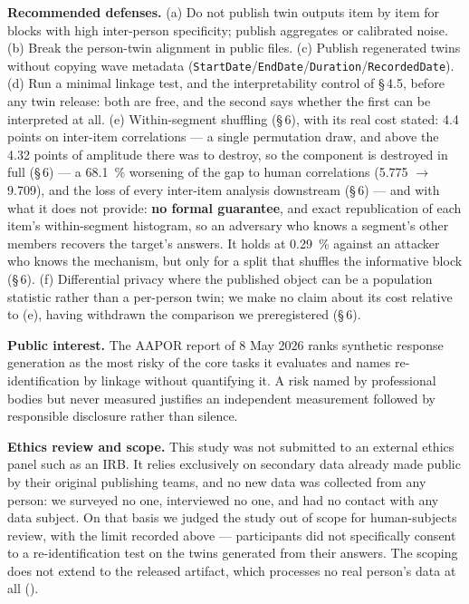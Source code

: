 \documentclass[sigconf,anonymous,review]{acmart}
\begin{document}
\begin{ethics}
\textbf{Recommended defenses.} (a) Do not publish twin outputs item by item for blocks with high inter-person specificity; publish aggregates or calibrated noise. (b) Break the person-twin alignment in public files. (c) Publish regenerated twins without copying wave metadata (\texttt{StartDate}/\texttt{EndDate}/\texttt{Duration}/\texttt{RecordedDate}). (d) Run a minimal linkage test, and the interpretability control of \S\,4.5, before any twin release: both are free, and the second says whether the first can be interpreted at all. (e) Within-segment shuffling (\S\,6), with its real cost stated: 4.4 points on inter-item correlations --- a single permutation draw, and above the 4.32 points of amplitude there was to destroy, so the component is destroyed in full (\S\,6) --- a 68.1~\% worsening of the gap to human correlations (5.775 $\rightarrow$ 9.709), and the loss of every inter-item analysis downstream (\S\,6) --- and with what it does not provide: \textbf{no formal guarantee}, and exact republication of each item's within-segment histogram, so an adversary who knows a segment's other members recovers the target's answers. It holds at 0.29~\% against an attacker who knows the mechanism, but only for a split that shuffles the informative block (\S\,6). (f) Differential privacy where the published object can be a population statistic rather than a per-person twin; we make no claim about its cost relative to (e), having withdrawn the comparison we preregistered (\S\,6).

\textbf{Public interest.} The AAPOR report of 8 May 2026 \cite{aapor2026responsibleai} ranks synthetic response generation as the most risky of the core tasks it evaluates and names re-identification by linkage without quantifying it. A risk named by professional bodies but never measured justifies an independent measurement followed by responsible disclosure rather than silence.

\textbf{Ethics review and scope.} This study was not submitted to an external ethics panel such as an IRB. It relies exclusively on secondary data already made public by their original publishing teams, and no new data was collected from any person: we surveyed no one, interviewed no one, and had no contact with any data subject. On that basis we judged the study out of scope for human-subjects review, with the limit recorded above --- participants did not specifically consent to a re-identification test on the twins generated from their answers. The scoping does not extend to the released artifact, which processes no real person's data at all (\osname{}).

\end{ethics}
\end{document}

